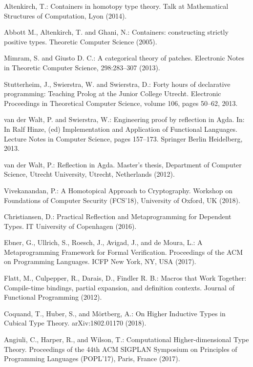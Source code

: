 \documentclass[runningheads]{llncs}
\begin{document}
\begin{thebibliography}{4}
 Altenkirch, T.: Containers in homotopy type theory. Talk at Mathematical Structures of Computation, Lyon (2014).

 Abbott M., Altenkirch, T. and Ghani, N.: Containers: constructing strictly positive types. Theoretic Computer Science (2005).

 Mimram, S. and Giusto D. C.: A categorical theory of patches. Electronic Notes in Theoretic Computer Science, 298:283–307 (2013).

 Stutterheim, J., Swierstra, W. and Swierstra, D.: Forty hours of declarative programming: Teaching Prolog at the Junior College Utrecht.  Electronic Proceedings in Theoretical Computer Science, volume 106, pages 50–62, 2013.

 van der Walt, P. and Swierstra, W.: Engineering proof by reflection in Agda. In: In Ralf Hinze, (ed) Implementation and Application of Functional Languages. Lecture Notes in Computer Science, pages 157–173. Springer Berlin Heidelberg, 2013.

 van der Walt, P.: Reflection in Agda. Master’s thesis, Department of Computer Science, Utrecht University, Utrecht, Netherlands (2012).


 Vivekanandan, P.: A Homotopical Approach to Cryptography. Workshop on Foundations of Computer Security (FCS'18), University of Oxford, UK (2018).

 Christiansen, D.: Practical Reflection and Metaprogramming for Dependent Types. IT University of Copenhagen (2016).

 Ebner, G., Ullrich, S., Roesch, J., Avigad, J., and de Moura, L.: A Metaprogramming Framework for Formal Verification. Proceedings of the ACM on Programming Languages. ICFP New York, NY, USA (2017).

 Flatt, M., Culpepper, R., Darais, D., Findler R. B.: Macros that Work Together: Compile-time bindings, partial expansion, and definition contexts. Journal of Functional Programming (2012).

 Coquand, T., Huber, S., and Mörtberg, A.: On Higher Inductive Types in Cubical Type Theory. arXiv:1802.01170 (2018).

 Angiuli, C., Harper, R., and Wilson, T.: Computational Higher-dimensional Type Theory. Proceedings of the 44th ACM SIGPLAN Symposium on Principles of Programming Languages (POPL'17), Paris, France (2017).


\end{thebibliography}
\end{document}
